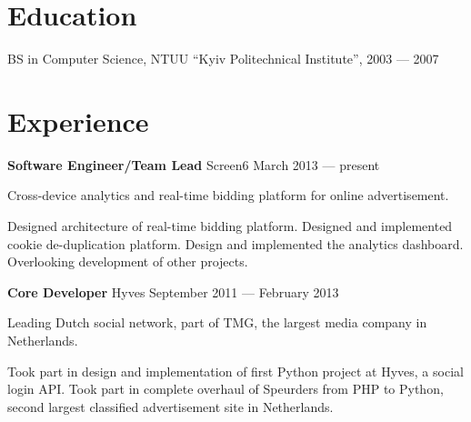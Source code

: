 \documentclass[margin]{res}
\begin{document}

\address{{\bf Mailing address} \\ Czaar Peterstraat 103B \\ 1018PE, Amsterdam, The Netherlands}

\address{{\bf Contacts} \\ +31 62 980 61 41 \\ contact@mishkovskyi.net \\ \href{https://github.com/mishok13}{mishok13@GitHub}}

\begin{resume}


\section{Education}
BS in Computer Science, NTUU ``Kyiv Politechnical Institute'', 2003 --- 2007

\section{Experience}

{\bf Software Engineer/Team Lead} Screen6 \hfill March 2013 --- present

Cross-device analytics and real-time bidding platform for online
advertisement.

Designed architecture of real-time bidding platform. Designed and
implemented cookie de-duplication platform. Design and implemented the
analytics dashboard. Overlooking development of other projects.

{\bf Core Developer} Hyves \hfill September 2011 --- February 2013

Leading Dutch social network, part of TMG, the largest media company
in Netherlands.

Took part in design and implementation of first Python project at
Hyves, a social login API. Took part in complete overhaul of Speurders
from PHP to Python, second largest classified advertisement site in
Netherlands.


\end{resume}
\end{document}
